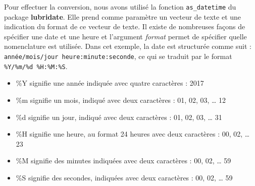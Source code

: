 \documentclass[
  11pt,
  french,
]{book}
\makeatletter
\newenvironment{Shaded}{\begin{snugshade}}{\end{snugshade}}
\newcommand{\CommentTok}[1]{\textcolor[rgb]{0.56,0.35,0.01}{\textit{#1}}}
\newcommand{\DataTypeTok}[1]{\textcolor[rgb]{0.13,0.29,0.53}{#1}}
\newcommand{\DecValTok}[1]{\textcolor[rgb]{0.00,0.00,0.81}{#1}}
\newcommand{\KeywordTok}[1]{\textcolor[rgb]{0.13,0.29,0.53}{\textbf{#1}}}
\newcommand{\NormalTok}[1]{#1}
\newcommand{\OperatorTok}[1]{\textcolor[rgb]{0.81,0.36,0.00}{\textbf{#1}}}
\newcommand{\StringTok}[1]{\textcolor[rgb]{0.31,0.60,0.02}{#1}}
\providecommand{\tightlist}{%
  \setlength{\itemsep}{0pt}\setlength{\parskip}{0pt}}
\newenvironment{kframe}{%
\medskip{}
\setlength{\fboxsep}{.8em}
 \def\at@end@of@kframe{}%
 \ifinner\ifhmode%
  \def\at@end@of@kframe{\end{minipage}}%
  \begin{minipage}{\columnwidth}%
 \fi\fi%
 \def\FrameCommand##1{\hskip\@totalleftmargin \hskip-\fboxsep
 \colorbox{shadecolor}{##1}\hskip-\fboxsep
     \hskip-\linewidth \hskip-\@totalleftmargin \hskip\columnwidth}%
 \MakeFramed {\advance\hsize-\width
   \@totalleftmargin\z@ \linewidth\hsize
   \@setminipage}}%
 {\par\unskip\endMakeFramed%
 \at@end@of@kframe}
\renewenvironment{Shaded}{\begin{kframe}}{\end{kframe}}
\makeatother
\begin{document}
\begin{Shaded}
\end{Shaded}

Pour effectuer la conversion, nous avons utilisé la fonction \texttt{as\_datetime} du package \textbf{lubridate}. Elle prend comme paramètre un vecteur de texte et une indication du format de ce vecteur de texte. Il existe de nombreuses façons de spécifier une date et une heure et l'argument \emph{format} permet de spécifier quelle nomenclature est utilisée. Dans cet exemple, la date est structurée comme suit :
\texttt{année/mois/jour\ heure:minute:seconde}, ce qui se traduit par le format \texttt{\%Y/\%m/\%d\ \%H:\%M:\%S}.

\begin{itemize}
\tightlist
\item
  \%Y signifie une année indiquée avec quatre caractères : 2017
\item
  \%m signifie un mois, indiqué avec deux caractères : 01, 02, 03, \ldots{} 12
\item
  \%d signifie un jour, indiqué avec deux caractères : 01, 02, 03, \ldots{} 31
\item
  \%H signifie une heure, au format 24 heures avec deux caractères : 00, 02, \ldots{} 23
\item
  \%M signifie des minutes indiquées avec deux caractères : 00, 02, \ldots{} 59
\item
  \%S signifie des secondes, indiquées avec deux caractères : 00, 02, \ldots{} 59
\end{itemize}
\end{document}
